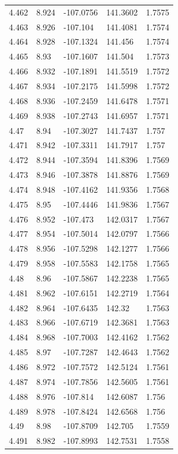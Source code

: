 \begin{tabular}{lllll}
4.462 & 8.924 & -107.0756 & 141.3602 & 1.7575 \\
4.463 & 8.926 & -107.104 & 141.4081 & 1.7574 \\
4.464 & 8.928 & -107.1324 & 141.456 & 1.7574 \\
4.465 & 8.93 & -107.1607 & 141.504 & 1.7573 \\
4.466 & 8.932 & -107.1891 & 141.5519 & 1.7572 \\
4.467 & 8.934 & -107.2175 & 141.5998 & 1.7572 \\
4.468 & 8.936 & -107.2459 & 141.6478 & 1.7571 \\
4.469 & 8.938 & -107.2743 & 141.6957 & 1.7571 \\
4.47 & 8.94 & -107.3027 & 141.7437 & 1.757 \\
4.471 & 8.942 & -107.3311 & 141.7917 & 1.757 \\
4.472 & 8.944 & -107.3594 & 141.8396 & 1.7569 \\
4.473 & 8.946 & -107.3878 & 141.8876 & 1.7569 \\
4.474 & 8.948 & -107.4162 & 141.9356 & 1.7568 \\
4.475 & 8.95 & -107.4446 & 141.9836 & 1.7567 \\
4.476 & 8.952 & -107.473 & 142.0317 & 1.7567 \\
4.477 & 8.954 & -107.5014 & 142.0797 & 1.7566 \\
4.478 & 8.956 & -107.5298 & 142.1277 & 1.7566 \\
4.479 & 8.958 & -107.5583 & 142.1758 & 1.7565 \\
4.48 & 8.96 & -107.5867 & 142.2238 & 1.7565 \\
4.481 & 8.962 & -107.6151 & 142.2719 & 1.7564 \\
4.482 & 8.964 & -107.6435 & 142.32 & 1.7563 \\
4.483 & 8.966 & -107.6719 & 142.3681 & 1.7563 \\
4.484 & 8.968 & -107.7003 & 142.4162 & 1.7562 \\
4.485 & 8.97 & -107.7287 & 142.4643 & 1.7562 \\
4.486 & 8.972 & -107.7572 & 142.5124 & 1.7561 \\
4.487 & 8.974 & -107.7856 & 142.5605 & 1.7561 \\
4.488 & 8.976 & -107.814 & 142.6087 & 1.756 \\
4.489 & 8.978 & -107.8424 & 142.6568 & 1.756 \\
4.49 & 8.98 & -107.8709 & 142.705 & 1.7559 \\
4.491 & 8.982 & -107.8993 & 142.7531 & 1.7558 \\

\end{tabular}
